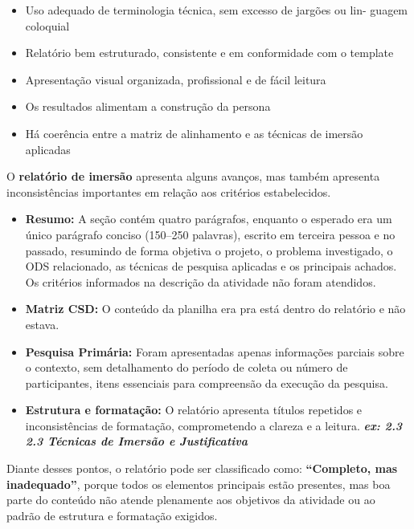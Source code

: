 \documentclass[
  sigconf,
  nonacm, %
  language=portuguese
]{acmart}
\begin{document}
\begin{itemize}[leftmargin=14pt,itemsep=1pt,topsep=3pt,parsep=0pt]
  \item[$\square$] {\small\textcolor{cmuted}{Uso adequado de terminologia técnica, sem excesso de jargões ou lin- guagem coloquial}}
  \item[$\square$] {\small\textcolor{cmuted}{Relatório bem estruturado, consistente e em conformidade com o template}}
  \item[$\square$] {\small\textcolor{cmuted}{Apresentação visual organizada, profissional e de fácil leitura}}
  \item[$\square$] {\small\textcolor{cmuted}{Os resultados alimentam a construção da persona}}
  \item[$\square$] {\small\textcolor{cmuted}{Há coerência entre a matriz de alinhamento e as técnicas de imersão aplicadas}}
\end{itemize}

O \textbf{relatório de imersão} apresenta alguns avanços, mas também apresenta inconsistências importantes em relação aos critérios estabelecidos.

\begin{itemize}[leftmargin=14pt,itemsep=2pt,topsep=4pt]
  \item \textbf{Resumo:} A seção contém quatro parágrafos, enquanto o esperado era um único parágrafo conciso (150–250 palavras), escrito em terceira pessoa e no passado, resumindo de forma objetiva o projeto, o problema investigado, o ODS relacionado, as técnicas de pesquisa aplicadas e os principais achados. Os critérios informados na descrição da atividade não foram atendidos.
  \item \textbf{Matriz CSD:} O conteúdo da planilha era pra está dentro do relatório e não estava.
  \item \textbf{Pesquisa Primária:} Foram apresentadas apenas informações parciais sobre o contexto, sem detalhamento do período de coleta ou número de participantes, itens essenciais para compreensão da execução da pesquisa.
  \item \textbf{Estrutura e formatação:} O relatório apresenta títulos repetidos e inconsistências de formatação, comprometendo a clareza e a leitura. \textbf{\textit{ex: 2.3 2.3 Técnicas de Imersão e Justificativa}}
\end{itemize}

Diante desses pontos, o relatório pode ser classificado como: \textbf{“Completo, mas inadequado”}, porque todos os elementos principais estão presentes, mas boa parte do conteúdo não atende plenamente aos objetivos da atividade ou ao padrão de estrutura e formatação exigidos.
\end{document}

